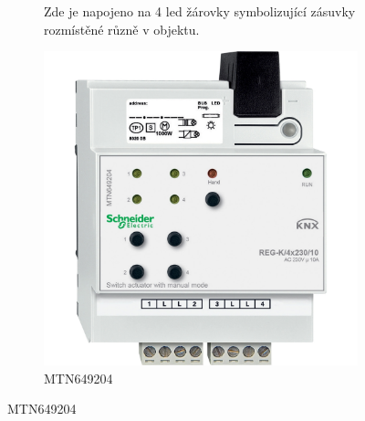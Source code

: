 \documentclass[12pt, a4paper,
twoside,        %
openright
]{report}
\begin{document}
\begin{figure}[h]
\begin{subfigure}{0.85\textwidth}
	\noindent Zde je napojeno na 4 led žárovky symbolizující zásuvky rozmístěné různě v objektu.


		\centering
		\includegraphics[scale=0.085]{image/MTN649204.jpg}
		\caption{MTN649204}
		\label{image:2}
\end{subfigure}
\end{figure}
\end{document}
